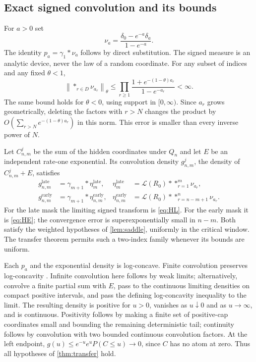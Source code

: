 \documentclass[11pt,oneside]{article}
\theoremstyle{remark}\newtheorem{remark}[theorem]{Remark}
\newcommand{\Law}{\mathcal L}
\numberwithin{equation}{section}
\begin{document}
\subsection{Exact signed convolution and its bounds}
For $a>0$ set
\begin{equation}
 \nu_a=\frac{\delta_0-e^{-a}\delta_a}{1-e^{-a}}.
 \label{eq:nu}
\end{equation}
The identity $p_a=\gamma_1*\nu_a$ follows by direct substitution.
The signed measure is an analytic device, never the law of a random
coordinate. For any subset of indices and any fixed $\theta<1$,
\begin{equation}
 \left\|\mathop{*}_{r\in D}\nu_{a_r}\right\|_\theta
 \le\prod_{r\ge1}\frac{1+e^{-(1-\theta)a_r}}{1-e^{-a_r}}<\infty.
 \label{eq:weighted}
\end{equation}
The same bound holds for $\theta<0$, using support in $[0,\infty)$.
Since $a_r$ grows geometrically, deleting the factors with $r>N$ changes
the product by $O(\sum_{r>N}e^{-(1-\theta)a_r})$ in this norm.
This error is smaller than every inverse power of $N$.

Let $C^j_{n,m}$ be the sum of the hidden coordinates under $Q_n$ and
let $E$ be an independent rate-one exponential. Its convolution density
$g^j_{n,m}$, the density of $C^j_{n,m}+E$, satisfies
\begin{align}
 g^{\mathrm{late}}_{n,m}
   &=\gamma_{m+1}*\eta_m^{\mathrm{late}},&
 \eta_m^{\mathrm{late}}
   &=\Law(R_0)*\mathop{*}_{r=1}^m\nu_{a_r},\label{eq:lateeta}\\
 g^{\mathrm{early}}_{n,m}
   &=\gamma_{m+1}*\eta_{n,m}^{\mathrm{early}},&
 \eta_{n,m}^{\mathrm{early}}
   &=\Law(R_0)*\mathop{*}_{r=n-m+1}^n\nu_{a_r}.
 \label{eq:earlyeta}
\end{align}
For the late mask the limiting signed transform is \eqref{eq:HL}.
For the early mask it is \eqref{eq:HE}; the convergence error is
superexponentially small in $n-m$. Both satisfy the weighted hypotheses
of \cref{lem:saddle}, uniformly in the critical window. The transfer
theorem permits such a two-index family whenever its bounds are uniform.

Each $p_a$ and the exponential density is log-concave. Finite convolution
preserves log-concavity \cite{prekopa}. Infinite convolution here follows
by weak limits; alternatively, convolve a finite partial sum with $E$,
pass to the continuous limiting densities on compact positive intervals,
and pass the defining log-concavity inequality to the limit.
The resulting density is positive for $u>0$, vanishes as $u\downarrow0$
and as $u\to\infty$, and is continuous. Positivity follows by making a
finite set of positive-cap coordinates small and bounding the remaining
deterministic tail; continuity follows by convolution with two bounded
continuous convolution factors. At the left endpoint,
$g(u)\le e^{-u}e^uP(C\le u)\to0$, since $C$ has no atom at zero.
Thus all hypotheses of \cref{thm:transfer} hold.
\end{document}
